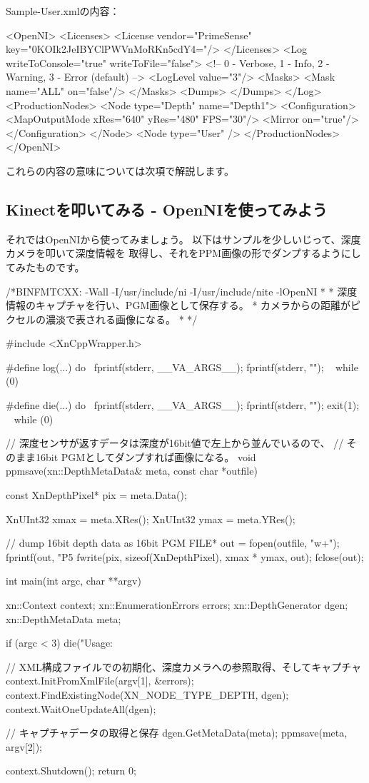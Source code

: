 \documentclass[mingoth,a4paper]{jsarticle}
\begin{document}
Sample-User.xmlの内容：
\begin{commandline}
<OpenNI>
  <Licenses>
    <License vendor="PrimeSense" key="0KOIk2JeIBYClPWVnMoRKn5cdY4="/>
  </Licenses>
  <Log writeToConsole="true" writeToFile="false">
    <!-- 0 - Verbose, 1 - Info, 2 - Warning, 3 - Error (default) -->
    <LogLevel value="3"/>
    <Masks>
    <Mask name="ALL" on="false"/>
    </Masks>
    <Dumps>
    </Dumps>
  </Log>
  <ProductionNodes>
    <Node type="Depth" name="Depth1">
      <Configuration>
      <MapOutputMode xRes="640" yRes="480" FPS="30"/>
      <Mirror on="true"/>
      </Configuration>
    </Node>
    <Node type="User" />
  </ProductionNodes>
</OpenNI>
\end{commandline}

これらの内容の意味については次項で解説します。

\subsection{Kinectを叩いてみる - OpenNIを使ってみよう}
それではOpenNIから使ってみましょう。
以下はサンプルを少しいじって、深度カメラを叩いて深度情報を
取得し、それをPPM画像の形でダンプするようにしてみたものです。

\begin{commandline}
/*BINFMTCXX: -Wall -I/usr/include/ni -I/usr/include/nite -lOpenNI
 *
 * 深度情報のキャプチャを行い、PGM画像として保存する。
 * カメラからの距離がピクセルの濃淡で表される画像になる。
 *
 */

#include <XnCppWrapper.h>

#define log(...) do { \
        fprintf(stderr, __VA_ARGS__); fprintf(stderr, "\n");    \
    } while (0)

#define die(...) do { \
        fprintf(stderr, __VA_ARGS__); fprintf(stderr, "\n"); exit(1);   \
    } while (0)

// 深度センサが返すデータは深度が16bit値で左上から並んでいるので、
// そのまま16bit PGMとしてダンプすれば画像になる。
void
ppmsave(xn::DepthMetaData& meta, const char *outfile) {
    const XnDepthPixel* pix = meta.Data();

    XnUInt32 xmax = meta.XRes();
    XnUInt32 ymax = meta.YRes();

    // dump 16bit depth data as 16bit PGM
    FILE* out = fopen(outfile, "w+");
    fprintf(out, "P5\n%
    fwrite(pix, sizeof(XnDepthPixel), xmax * ymax, out);
    fclose(out);
}

int
main(int argc, char **argv) {
    xn::Context context;
    xn::EnumerationErrors errors;
    xn::DepthGenerator dgen;
    xn::DepthMetaData meta;

    if (argc < 3) {
        die("Usage: %
    }

    // XML構成ファイルでの初期化、深度カメラへの参照取得、そしてキャプチャ
    context.InitFromXmlFile(argv[1], &errors);
    context.FindExistingNode(XN_NODE_TYPE_DEPTH, dgen);
    context.WaitOneUpdateAll(dgen);

    // キャプチャデータの取得と保存
    dgen.GetMetaData(meta);
    ppmsave(meta, argv[2]);

    context.Shutdown();
    return 0;
}
\end{commandline}
\end{document}
